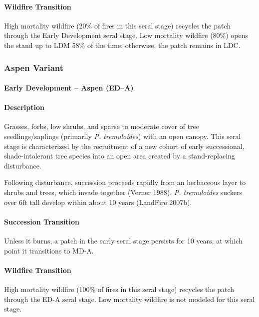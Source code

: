 \paragraph{Wildfire Transition} High mortality wildfire (20\% of fires in this seral stage) recycles the patch through the Early Development seral stage. Low mortality wildfire (80\%) opens the stand up to LDM 58\% of the time; otherwise, the patch remains in LDC.

\noindent\hrulefill
\noindent\hrulefill

\subsubsection{Aspen Variant}

\paragraph{Early Development – Aspen (ED–A)}

\paragraph{Description} Grasses, forbs, low shrubs, and sparse to moderate cover of tree seedlings/saplings (primarily \emph{P. tremuloides}) with an open canopy. This seral stage is characterized by the recruitment of a new cohort of early successional, shade-intolerant tree species into an open area created by a stand-replacing disturbance. 

Following disturbance, succession proceeds rapidly from an herbaceous layer to shrubs and trees, which invade together (Verner 1988). \emph{P. tremuloides} suckers over 6ft tall develop within about 10 years (LandFire 2007b). 

\paragraph{Succession Transition} Unless it burns, a patch in the early seral stage persists for 10 years, at which point it transitions to MD-A.

\paragraph{Wildfire Transition} High mortality wildfire (100\% of fires in this seral stage) recycles the patch through the ED-A seral stage. Low mortality wildfire is not modeled for this seral stage.

\noindent\hrulefill


